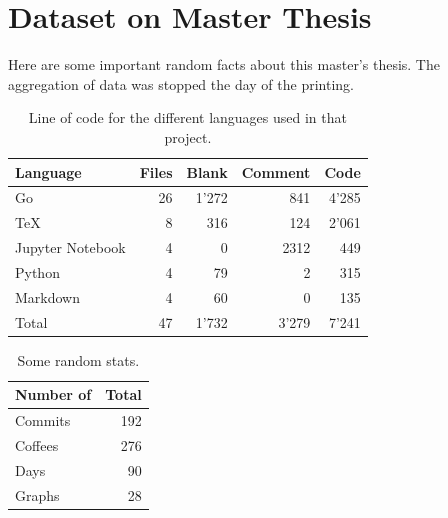 \documentclass[a4paper,11pt,twoside=semi,openright]{report}
\begin{document}
\chapter{Dataset on Master Thesis}
Here are some important random facts about this master's thesis. The
aggregation of data was stopped the day of the printing. 
\begin{table}[h]
\centering
\begin{tabular}{@{}lrrrr@{}}
\toprule
\textbf{Language}   &\textbf{Files} & \textbf{Blank} & \textbf{Comment} & \textbf{Code} \\ \midrule
Go    & 26 & 1'272 & 841  & 4'285 \\ \hdashline
TeX    & 8  & 316 & 124  & 2'061 \\ \hdashline
Jupyter Notebook & 4  & 0  & 2312  & 449 \\ \hdashline
Python   & 4  & 79 & 2  & 315 \\ \hdashline
Markdown   & 4  & 60 & 0  & 135 \\ \midrule
Total   & 47 & 1'732 & 3'279 & 7'241 \\
\midrule
\bottomrule
\end{tabular}
\caption{Line of code for the different languages used in that project.}
\label{tab:my-table}
\end{table}

\begin{table}[h]
\centering
\begin{tabular}{@{}lr@{}}
\toprule
\textbf{Number of}    & \textbf{Total} \\ \midrule
 Commits & 192 \\ \hdashline
 Coffees & 276 \\ \hdashline
Days & 90 \\ \hdashline
Graphs & 28 \\
\midrule
\bottomrule
\end{tabular}
\caption{Some random stats.}
\label{tab:my-table}
\end{table}
\end{document}
